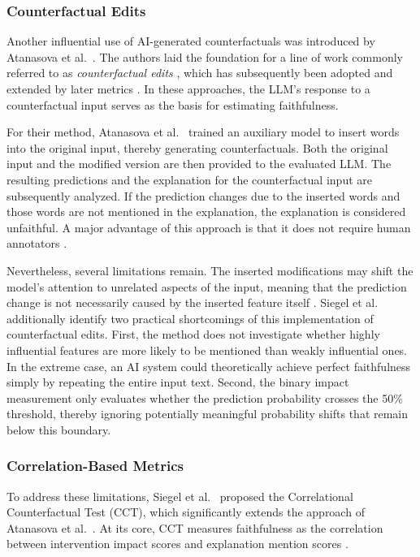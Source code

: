 \subsubsection{Counterfactual Edits}
Another influential use of AI-generated counterfactuals was introduced by Atanasova et al.~\cite{atanasovaFaithfulnessTestsNatural2023}. The authors laid the foundation for a line of work commonly referred to as \emph{counterfactual edits} \cite{parcalabescuMeasuringFaithfulnessSelfconsistency2024, mattonWalkTalkMeasuring2024}, which has subsequently been adopted and extended by later metrics \cite{siegelProbabilitiesAlsoMatter2024, mattonWalkTalkMeasuring2024}. In these approaches, the LLM’s response to a counterfactual input serves as the basis for estimating faithfulness.

For their method, Atanasova et al.~\cite{atanasovaFaithfulnessTestsNatural2023} trained an auxiliary model to insert words into the original input, thereby generating counterfactuals. Both the original input and the modified version are then provided to the evaluated LLM. The resulting predictions and the explanation for the counterfactual input are subsequently analyzed. If the prediction changes due to the inserted words and those words are not mentioned in the explanation, the explanation is considered unfaithful. A major advantage of this approach is that it does not require human annotators \cite{parcalabescuMeasuringFaithfulnessSelfconsistency2024}.

Nevertheless, several limitations remain. The inserted modifications may shift the model’s attention to unrelated aspects of the input, meaning that the prediction change is not necessarily caused by the inserted feature itself \cite{atanasovaFaithfulnessTestsNatural2023}. Siegel et al.~\cite{siegelProbabilitiesAlsoMatter2024} additionally identify two practical shortcomings of this implementation of counterfactual edits. First, the method does not investigate whether highly influential features are more likely to be mentioned than weakly influential ones. In the extreme case, an AI system could theoretically achieve perfect faithfulness simply by repeating the entire input text. Second, the binary impact measurement only evaluates whether the prediction probability crosses the 50\% threshold, thereby ignoring potentially meaningful probability shifts that remain below this boundary.

\subsubsection{Correlation-Based Metrics}
To address these limitations, Siegel et al.~\cite{siegelProbabilitiesAlsoMatter2024} proposed the Correlational Counterfactual Test (CCT), which significantly extends the approach of Atanasova et al.~\cite{atanasovaFaithfulnessTestsNatural2023}. At its core, CCT measures faithfulness as the correlation between intervention impact scores and explanation mention scores \cite{mattonWalkTalkMeasuring2024}.

